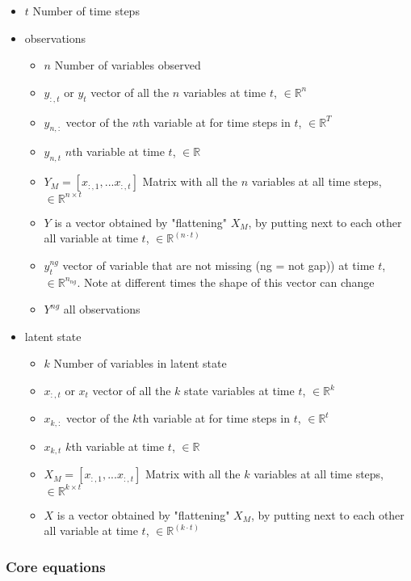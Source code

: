 \documentclass{article}
\begin{document}
\begin{itemize}
\item $t$  Number of time steps
\item observations
\begin{itemize}
    \item $n$  Number of variables observed
    \item $y_{:,t}$ or $y_t$ vector of all the $n$ variables at time $t$, $\in \mathbb{R}^n $
    \item $y_{n,:}$ vector of the $n$th variable at for time steps in $t$, $\in \mathbb{R}^T$
    \item $y_{n,t}$ $n$th variable at time $t$, $\in \mathbb{R}$ 
    \item $Y_M = [x_{:,1}, ... x_{:, t}]$ Matrix with all the $n$ variables at all time steps, $\in \mathbb{R}^{n \times t}$ 
    \item $Y$ is a vector obtained by "flattening" $X_M$, by putting next to each other all variable at time $t$, $\in \mathbb{R}^{(n \cdot t)}$
    \item $y^{ng}_t$ vector of variable that are not missing (ng = not gap)) at time $t$, $\in \mathbb{R}^{n_{ng}}$. Note at different times the shape of this vector can change
    \item $Y^{ng}$ all observations
\end{itemize}

\item latent state
\begin{itemize}
    \item $k$  Number of variables in latent state
    \item $x_{:,t}$ or $x_t$ vector of all the $k$ state variables at time $t$, $\in \mathbb{R}^k $
    \item $x_{k,:}$ vector of the $k$th variable at for time steps in $t$, $\in \mathbb{R}^t$
    \item $x_{k,t}$ $k$th variable at time $t$, $\in \mathbb{R}$ 
    \item $X_M = [x_{:,1}, ... x_{:, t}]$ Matrix with all the $k$ variables at all time steps, $\in \mathbb{R}^{k \times t}$ 
    \item $X$ is a vector obtained by "flattening" $X_M$, by putting next to each other all variable at time $t$, $\in \mathbb{R}^{(k \cdot t)}$
\end{itemize}

\end{itemize}


\subsubsection{Core equations}
\end{document}
